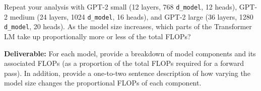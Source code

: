 \begin{questionbox}
    Repeat your analysis with GPT-2 small (12 layers, 768 \texttt{d\_model}, 12 heads), GPT-2 medium (24 layers, 1024 \texttt{d\_model}, 16 heads), and GPT-2 large (36 layers, 1280 \texttt{d\_model}, 20 heads). As the model size increases, which parts of the Transformer LM take up proportionally more or less of the total FLOPs?

    \textbf{Deliverable:} For each model, provide a breakdown of model components and its associated FLOPs (as a proportion of the total FLOPs required for a forward pass). In addition, provide a one-to-two sentence description of how varying the model size changes the proportional FLOPs of each component.
\end{questionbox}

